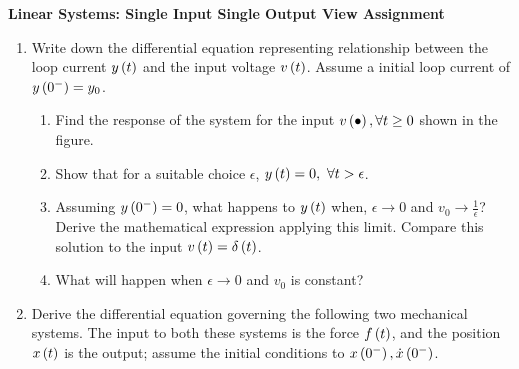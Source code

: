 \documentclass[9pt]{article}
\def\lp{\ensuremath\left(}
\def\rp{\ensuremath\right)}
\newcommand{\ct}[1]{\lp #1\rp}
\begin{document}
\begin{center}
\begin{Large}
\textbf{Linear Systems: Single Input Single Output View Assignment}
\end{Large}
\end{center}
\vspace{0.2cm}

\begin{multicols}{2}
\begin{enumerate}[resume]
    \item Write down the differential equation representing relationship between the loop current $y\ct{t}$ and the input voltage $v\ct{t}$. Assume a initial loop current of $y\ct{0^-} = y_0$.
    \begin{center}
    \end{center}
    \begin{enumerate}
        \item Find the response of the system for the input $v\ct{\bullet}, \forall t \geq 0$ shown in the figure.
        \item Show that for a suitable choice $\epsilon$, $y\ct{t} = 0, \,\, \forall t > \epsilon$.
        \item Assuming $y\ct{0^-} = 0$, what happens to $y\ct{t}$ when, $\epsilon \to 0$ and $v_0 \to \frac{1}{\epsilon}$? Derive the mathematical expression applying this limit. Compare this solution to the input $v\ct{t} = \delta\ct{t}$.
        \item What will happen when $\epsilon \to 0$ and $v_0$ is constant?  
    \end{enumerate}

    \item Derive the differential equation governing the following two mechanical systems. The input to both these systems is the force $f\ct{t}$, and the position $x\ct{t}$ is the output; assume the initial conditions to $x\ct{0^-}, \dot{x}\ct{0^-}$.


\end{enumerate}
\end{multicols}
\end{document}
